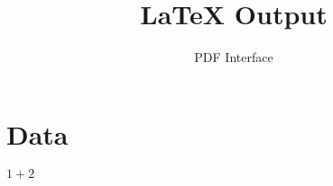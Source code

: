 \documentclass{article}[11pt]
\begin{document}
\title{LaTeX Output}
\author{PDF Interface}
\maketitle
\section{Data}
$1 + 2$
\end{document}
